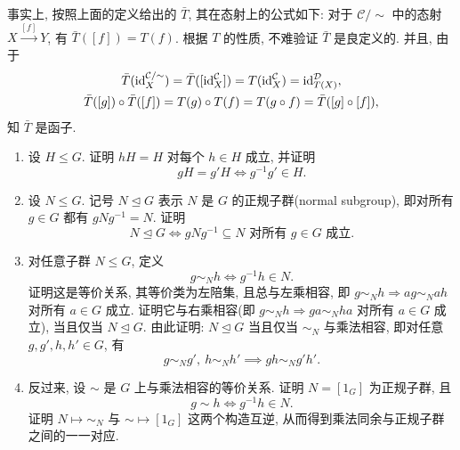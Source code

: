\documentclass{article}
\begin{document}
\begin{solution}
	事实上, 按照上面的定义给出的 $\bar{T}$, 其在态射上的公式如下: 对于 $\mathcal{C}/\sim $ 中的态射 $X \xrightarrow{[f]} Y$, 有 $\bar{T}([f]) = T(f)$. 根据 $T$ 的性质, 不难验证 $\bar{T}$ 是良定义的. 并且, 由于
	\begin{gather*}
		\bar{T}(\operatorname{id}_{X}^{\mathcal{C}/\sim}) = \bar{T}([\operatorname{id}_{X}^{\mathcal{C}}]) = T(\operatorname{id}_{X}^{\mathcal{C}}) = \operatorname{id}_{T(X)}^{\mathcal{D}}, \\
		\bar{T}([g]) \circ \bar{T}([f]) = T(g) \circ T(f) = T(g \circ f) = \bar{T}([g] \circ [f]),
	\end{gather*}
	知 $\bar{T}$ 是函子.
\end{solution}


\begin{problem}
\begin{enumerate}
  \item[(a)] 设 $H\le G$. 证明 $hH=H$ 对每个 $h\in H$ 成立, 并证明
  \[
    gH=g'H\iff g^{-1}g'\in H.
  \]
  \item[(b)] 设 $N\le G$. 记号 $N\unlhd G$ 表示 $N$ 是 $G$ 的正规子群(normal subgroup), 即对所有 $g\in G$ 都有 $gNg^{-1}=N$. 证明
  \[
    N\unlhd G\iff gNg^{-1}\subseteq N\text{ 对所有 }g\in G\text{ 成立}.
  \]
  \item[(c)] 对任意子群 $N\le G$, 定义
  \[
    g\sim_N h\iff g^{-1}h\in N.
  \]
  证明这是等价关系, 其等价类为左陪集, 且总与左乘相容, 即 $g\sim_N h\Rightarrow ag\sim_N ah$ 对所有 $a\in G$ 成立. 证明它与右乘相容(即 $g\sim_N h\Rightarrow ga\sim_N ha$ 对所有 $a\in G$ 成立), 当且仅当 $N\unlhd G$. 由此证明: $N\unlhd G$ 当且仅当 $\sim_N$ 与乘法相容, 即对任意 $g,g',h,h'\in G$, 有
  \[
    g\sim_N g',\ h\sim_N h'\implies gh\sim_N g'h'.
  \]
  \item[(d)] 反过来, 设 $\sim$ 是 $G$ 上与乘法相容的等价关系. 证明 $N=[1_G]$ 为正规子群, 且
  \[
    g\sim h\iff g^{-1}h\in N.
  \]
  证明 $N\mapsto{\sim_N}$ 与 ${\sim}\mapsto[1_G]$ 这两个构造互逆, 从而得到乘法同余与正规子群之间的一一对应.
\end{enumerate}
\end{problem}
\end{document}
